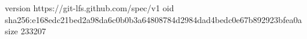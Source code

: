 version https://git-lfs.github.com/spec/v1
oid sha256:e168edc21bed2a98da6c0b0b3a64808784d2984dad4bedc0e67b892923bfea0a
size 233207

